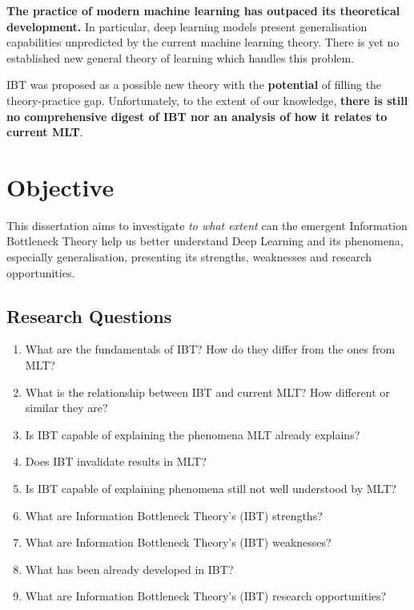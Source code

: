 \documentclass[
  letterpaper,
  12pt,
  british]{tufte-book}
\providecommand{\tightlist}{%
  \setlength{\itemsep}{0pt}\setlength{\parskip}{0pt}}\usepackage{longtable,booktabs,array}
\theoremstyle{plain}
\theoremstyle{plain}
\theoremstyle{definition}
\theoremstyle{remark}
\begin{document}
\textbf{The practice of modern machine learning has outpaced its
theoretical development.} In particular, deep learning models present
generalisation capabilities unpredicted by the current machine learning
theory. There is yet no established new general theory of learning which
handles this problem.

{IBT} was proposed as a possible new theory with the \textbf{potential}
of filling the theory-practice gap. Unfortunately, to the extent of our
knowledge, \textbf{there is still no comprehensive digest of {IBT} nor
an analysis of how it relates to current {MLT}}.

\hypertarget{objective}{%
\section{Objective}\label{objective}}

This dissertation aims to investigate \emph{to what extent} can the
emergent Information Bottleneck Theory help us better understand Deep
Learning and its phenomena, especially generalisation, presenting its
strengths, weaknesses and research opportunities.

\hypertarget{research-questions}{%
\subsection{Research Questions}\label{research-questions}}

\begin{enumerate}
\def\labelenumi{\arabic{enumi}.}
\tightlist
\item
  What are the fundamentals of IBT? How do they differ from the ones
  from MLT?
\item
  What is the relationship between IBT and current MLT? How different or
  similar they are?
\item
  Is IBT capable of explaining the phenomena MLT already explains?
\item
  Does IBT invalidate results in MLT?
\item
  Is IBT capable of explaining phenomena still not well understood by
  MLT?
\item
  What are Information Bottleneck Theory's (IBT) strengths?
\item
  What are Information Bottleneck Theory's (IBT) weaknesses?
\item
  What has been already developed in IBT?
\item
  What are Information Bottleneck Theory's (IBT) research opportunities?
\end{enumerate}
\end{document}

